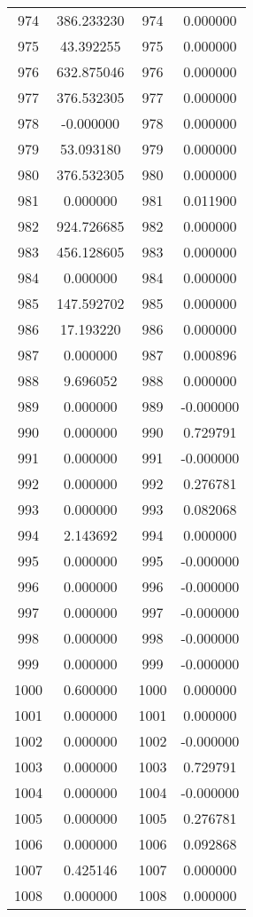 \documentclass[12pt]{article}
\begin{document}
\begin{longtable}{@{}cccc@{}}
974 & 386.233230 & 974 & 0.000000 \\
975 & 43.392255 & 975 & 0.000000 \\
976 & 632.875046 & 976 & 0.000000 \\
977 & 376.532305 & 977 & 0.000000 \\
978 & -0.000000 & 978 & 0.000000 \\
979 & 53.093180 & 979 & 0.000000 \\
980 & 376.532305 & 980 & 0.000000 \\
981 & 0.000000 & 981 & 0.011900 \\
982 & 924.726685 & 982 & 0.000000 \\
983 & 456.128605 & 983 & 0.000000 \\
984 & 0.000000 & 984 & 0.000000 \\
985 & 147.592702 & 985 & 0.000000 \\
986 & 17.193220 & 986 & 0.000000 \\
987 & 0.000000 & 987 & 0.000896 \\
988 & 9.696052 & 988 & 0.000000 \\
989 & 0.000000 & 989 & -0.000000 \\
990 & 0.000000 & 990 & 0.729791 \\
991 & 0.000000 & 991 & -0.000000 \\
992 & 0.000000 & 992 & 0.276781 \\
993 & 0.000000 & 993 & 0.082068 \\
994 & 2.143692 & 994 & 0.000000 \\
995 & 0.000000 & 995 & -0.000000 \\
996 & 0.000000 & 996 & -0.000000 \\
997 & 0.000000 & 997 & -0.000000 \\
998 & 0.000000 & 998 & -0.000000 \\
999 & 0.000000 & 999 & -0.000000 \\
1000 & 0.600000 & 1000 & 0.000000 \\
1001 & 0.000000 & 1001 & 0.000000 \\
1002 & 0.000000 & 1002 & -0.000000 \\
1003 & 0.000000 & 1003 & 0.729791 \\
1004 & 0.000000 & 1004 & -0.000000 \\
1005 & 0.000000 & 1005 & 0.276781 \\
1006 & 0.000000 & 1006 & 0.092868 \\
1007 & 0.425146 & 1007 & 0.000000 \\
1008 & 0.000000 & 1008 & 0.000000 \\

\end{longtable}
\end{document}
